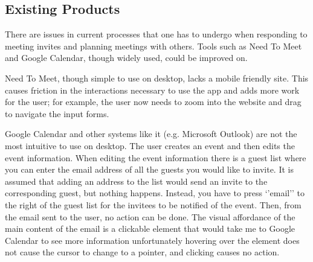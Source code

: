 \documentclass{sigchi}
\begin{document}
\subsection{Existing Products}

There are issues in current processes that one has to undergo when responding to meeting invites and planning meetings with others. Tools such as Need To Meet and Google Calendar, though widely used, could be improved on.

Need To Meet, though simple to use on desktop, lacks a mobile friendly site. This causes friction in the interactions necessary to use the app and adds more work for the user; for example, the user now needs to zoom into the website and drag to navigate the input forms. 

Google Calendar and other systems like it (e.g. Microsoft Outlook) are not the most intuitive to use on desktop. The user creates an event and then edits the event information. When editing the event information there is a guest list where you can enter the email address of all the guests you would like to invite. It is assumed that adding an address to the list would send an invite to the corresponding guest, but nothing happens. Instead, you have to press `'email'' to the right of the guest list for the invitees to be notified of the event. Then, from the email sent to the user, no action can be done. The visual affordance of the main content of the email is a clickable element that would take me to Google Calendar to see more information \textemdash unfortunately hovering over the element does not cause the cursor to change to a pointer, and clicking causes no action. 
\end{document}
